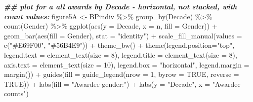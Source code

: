 \documentclass[
]{article}
\newenvironment{Shaded}{\begin{snugshade}}{\end{snugshade}}
\newcommand{\AttributeTok}[1]{\textcolor[rgb]{0.77,0.63,0.00}{#1}}
\newcommand{\ConstantTok}[1]{\textcolor[rgb]{0.00,0.00,0.00}{#1}}
\newcommand{\DecValTok}[1]{\textcolor[rgb]{0.00,0.00,0.81}{#1}}
\newcommand{\DocumentationTok}[1]{\textcolor[rgb]{0.56,0.35,0.01}{\textbf{\textit{#1}}}}
\newcommand{\FunctionTok}[1]{\textcolor[rgb]{0.00,0.00,0.00}{#1}}
\newcommand{\NormalTok}[1]{#1}
\newcommand{\OtherTok}[1]{\textcolor[rgb]{0.56,0.35,0.01}{#1}}
\newcommand{\SpecialCharTok}[1]{\textcolor[rgb]{0.00,0.00,0.00}{#1}}
\newcommand{\StringTok}[1]{\textcolor[rgb]{0.31,0.60,0.02}{#1}}
\begin{document}
\begin{Shaded}
\begin{Highlighting}[]
\DocumentationTok{\#\# plot for a all awards by Decade {-} horizontal, not stacked, with count values:}
\NormalTok{figure5A }\OtherTok{\textless{}{-}}\NormalTok{ BPindiv }\SpecialCharTok{\%\textgreater{}\%} 
  \FunctionTok{group\_by}\NormalTok{(Decade) }\SpecialCharTok{\%\textgreater{}\%}
  \FunctionTok{count}\NormalTok{(Gender) }\SpecialCharTok{\%\textgreater{}\%}
  \FunctionTok{ggplot}\NormalTok{(}\FunctionTok{aes}\NormalTok{(}\AttributeTok{y =}\NormalTok{ Decade, }\AttributeTok{x =}\NormalTok{ n, }\AttributeTok{fill =}\NormalTok{ Gender)) }\SpecialCharTok{+}
  \FunctionTok{geom\_bar}\NormalTok{(}\FunctionTok{aes}\NormalTok{(}\AttributeTok{fill =}\NormalTok{ Gender), }\AttributeTok{stat =} \StringTok{"identity"}\NormalTok{) }\SpecialCharTok{+} 
  \FunctionTok{scale\_fill\_manual}\NormalTok{(}\AttributeTok{values =} \FunctionTok{c}\NormalTok{(}\StringTok{"\#E69F00"}\NormalTok{, }\StringTok{"\#56B4E9"}\NormalTok{)) }\SpecialCharTok{+}
  \FunctionTok{theme\_bw}\NormalTok{() }\SpecialCharTok{+}
  \FunctionTok{theme}\NormalTok{(}\AttributeTok{legend.position=}\StringTok{"top"}\NormalTok{, }\AttributeTok{legend.text =} \FunctionTok{element\_text}\NormalTok{(}\AttributeTok{size =} \DecValTok{8}\NormalTok{), }\AttributeTok{legend.title =} \FunctionTok{element\_text}\NormalTok{(}\AttributeTok{size =} \DecValTok{8}\NormalTok{),}
        \AttributeTok{axis.text =} \FunctionTok{element\_text}\NormalTok{(}\AttributeTok{size =} \DecValTok{10}\NormalTok{), }\AttributeTok{legend.box =} \StringTok{"horizontal"}\NormalTok{, }\AttributeTok{legend.margin =} \FunctionTok{margin}\NormalTok{()) }\SpecialCharTok{+}
  \FunctionTok{guides}\NormalTok{(}\AttributeTok{fill =} \FunctionTok{guide\_legend}\NormalTok{(}\AttributeTok{nrow =} \DecValTok{1}\NormalTok{, }\AttributeTok{byrow =} \ConstantTok{TRUE}\NormalTok{, }\AttributeTok{reverse =} \ConstantTok{TRUE}\NormalTok{)) }\SpecialCharTok{+} 
  \FunctionTok{labs}\NormalTok{(}\AttributeTok{fill =} \StringTok{"Awardee gender:"}\NormalTok{) }\SpecialCharTok{+}
  \FunctionTok{labs}\NormalTok{(}\AttributeTok{y =} \StringTok{"Decade"}\NormalTok{, }\AttributeTok{x =} \StringTok{"Awardee counts"}\NormalTok{)  }


\end{Highlighting}
\end{Shaded}
\end{document}
